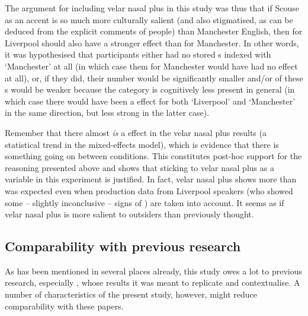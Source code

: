The argument for including velar nasal plus in this study was thus that if Scouse as an accent is so much more culturally salient (and also stigmatised, as can be deduced from the explicit comments of people) than Manchester English, then  for Liverpool should also have a stronger effect than  for Manchester.
In other words, it was hypothesised that participants either had no stored s indexed with `Manchester' at all (in which case  them for Manchester would have had no effect at all), or, if they did, their number would be significantly smaller and/or  of these s would be weaker because the category is cognitively less present in general (in which case there would have been a  effect for both `Liverpool' and `Manchester' in the same direction, but less strong in the latter case).

Remember that there almost \emph{is} a  effect in the velar nasal plus results (a statistical trend in the mixed-effects model), which is evidence that there is something going on between  conditions.
This constitutes post-hoc support for the reasoning presented above and shows that sticking to velar nasal plus as a variable in this experiment is justified.
In fact, velar nasal plus shows more  than was expected even when production data from Liverpool speakers (who showed some -- slightly inconclusive -- signs of ) are taken into account.
It seems as if velar nasal plus is more salient to outsiders than previously thought.

		\subsection{Comparability with previous research}

As has been mentioned in several places already, this study owes a lot to previous research, especially \citealt{niedzielski1999,hayetal2006a,hayetal2006b,haydrager2010}, whose results it was meant to replicate and contextualise.
A number of characteristics of the present study, however, might reduce comparability with these papers.

